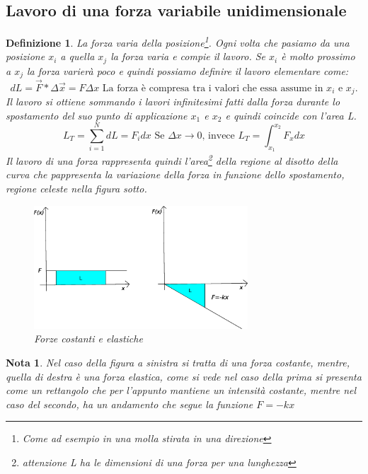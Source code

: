 \documentclass{book}
\newtheorem{defi}{Definizione}
\newtheorem{nota}{Nota}
\begin{document}
\subsection{Lavoro di una forza variabile unidimensionale}
\begin{defi}
  La forza varia della posizione\footnote{Come ad esempio in una molla stirata in una direzione}.
  Ogni volta che pasiamo da una posizione $x_i$ a quella $x_j$ la forza varia e compie il lavoro.
  Se $x_i$ è molto prossimo a $x_j$ la forza varierà poco e quindi possiamo definire il lavoro
  elementare come:
  \begin{equation*}
    dL=\vec{F}*\Delta\vec{x}=F\Delta x \text{ La forza è compresa tra i valori che
      essa assume in $x_i$ e $x_j$.}
  \end{equation*}
  Il lavoro si ottiene sommando i lavori infinitesimi fatti dalla forza durante lo spostamento del
  suo punto di applicazione $x_1$ e $x_2$ e quindi coincide con l'area L.
  \begin{equation*}
    L_T=\sum_{i=1}^N dL=F_idx \text{ Se $\Delta x \to 0$, invece } L_T=\int_{x_1}^{x_2} F_x dx
  \end{equation*}
  Il lavoro di una forza rappresenta quindi l'area\footnote{attenzione L ha le dimensioni di una
    forza per una lunghezza} della regione al disotto della curva che pappresenta la variazione
  della forza in funzione dello spostamento, regione celeste nella figura sotto.
  \clearpage
  \begin{figure}[th]
    \centering
    \includegraphics[width=8cm]{img/finiti/forze_costanti_e_elastiche.eps}
    \caption{Forze costanti e elastiche}
  \end{figure}
\end{defi}
\begin{nota}
  Nel caso della figura a sinistra si tratta di una forza costante, mentre, quella di destra è una
  forza elastica, come si vede nel caso della prima si presenta come un rettangolo che per
  l'appunto mantiene un intensità costante, mentre nel caso del secondo, ha un andamento che segue
  la funzione $F= -kx$
\end{nota}
\end{document}
